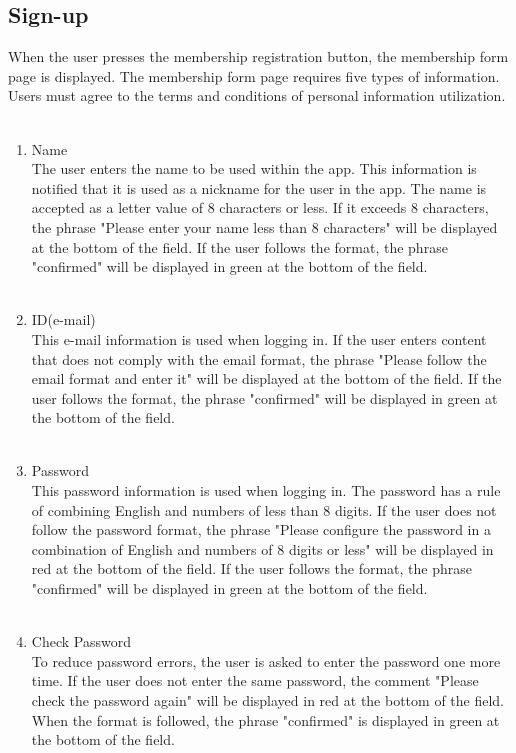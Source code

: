 \documentclass[conference]{IEEEtran}
\begin{document}
\subsection{Sign-up}
When the user presses the membership registration button, the membership form page is displayed. The membership form page requires five types of information. Users must agree to the terms and conditions of personal information utilization. \\ \\ 
\begin{enumerate}
    \item Name \\
        The user enters the name to be used within the app. This information is notified that it is used as a nickname for the user in the app. The name is accepted as a letter value of 8 characters or less. If it exceeds 8 characters, the phrase "Please enter your name less than 8 characters" will be displayed at the bottom of the field. If the user follows the format, the phrase "confirmed" will be displayed in green at the bottom of the field.\\ \\
    \item ID(e-mail) \\
        This e-mail information is used when logging in. If the user enters content that does not comply with the email format, the phrase "Please follow the email format and enter it" will be displayed at the bottom of the field. If the user follows the format, the phrase "confirmed" will be displayed in green at the bottom of the field.\\ \\
    \item Password \\
        This password information is used when logging in. The password has a rule of combining English and numbers of less than 8 digits. If the user does not follow the password format, the phrase "Please configure the password in a combination of English and numbers of 8 digits or less" will be displayed in red at the bottom of the field. If the user follows the format, the phrase "confirmed" will be displayed in green at the bottom of the field. \\ \\
    \item Check Password \\
        To reduce password errors, the user is asked to enter the password one more time. If the user does not enter the same password, the comment "Please check the password again" will be displayed in red at the bottom of the field. When the format is followed, the phrase "confirmed" is displayed in green at the bottom of the field. \\ \\

\end{enumerate}
\end{document}
